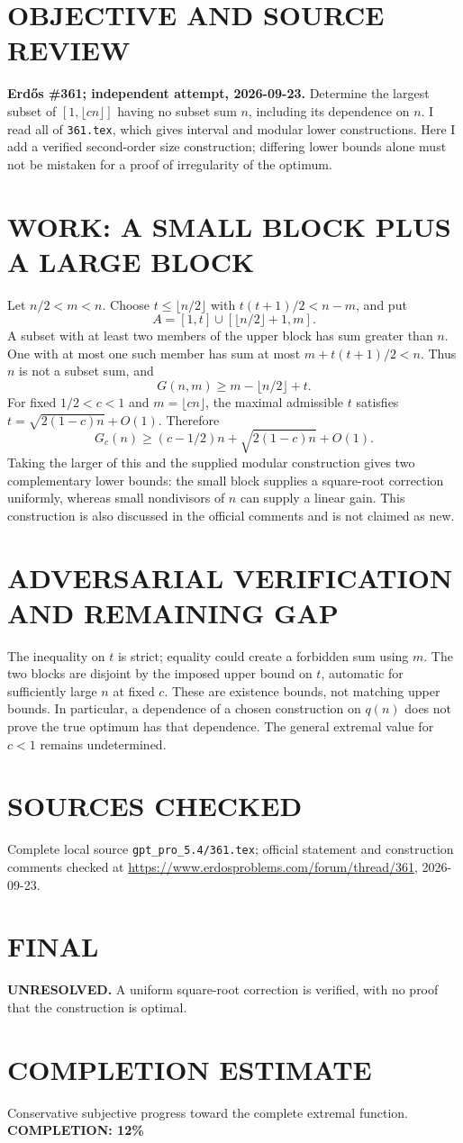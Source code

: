 \section{OBJECTIVE AND SOURCE REVIEW}
\textbf{Erd\H{o}s \#361; independent attempt, 2026-09-23.}
Determine the largest subset of $[1,\lfloor cn\rfloor]$ having no subset sum $n$, including its dependence on $n$. I read all of \texttt{361.tex}, which gives interval and modular lower constructions. Here I add a verified second-order size construction; differing lower bounds alone must not be mistaken for a proof of irregularity of the optimum.
\section{WORK: A SMALL BLOCK PLUS A LARGE BLOCK}
Let $n/2<m<n$. Choose $t\le\lfloor n/2\rfloor$ with $t(t+1)/2<n-m$, and put
\[
A=[1,t]\cup[\lfloor n/2\rfloor+1,m].
\]
A subset with at least two members of the upper block has sum greater than $n$. One with at most one such member has sum at most $m+t(t+1)/2<n$. Thus $n$ is not a subset sum, and
\[
G(n,m)\ge m-\lfloor n/2\rfloor+t.
\]
For fixed $1/2<c<1$ and $m=\lfloor cn\rfloor$, the maximal admissible $t$ satisfies $t=\sqrt{2(1-c)n}+O(1)$. Therefore
\[
G_c(n)\ge(c-1/2)n+\sqrt{2(1-c)n}+O(1).
\]
Taking the larger of this and the supplied modular construction gives two complementary lower bounds: the small block supplies a square-root correction uniformly, whereas small nondivisors of $n$ can supply a linear gain. This construction is also discussed in the official comments and is not claimed as new.
\section{ADVERSARIAL VERIFICATION AND REMAINING GAP}
The inequality on $t$ is strict; equality could create a forbidden sum using $m$. The two blocks are disjoint by the imposed upper bound on $t$, automatic for sufficiently large $n$ at fixed $c$. These are existence bounds, not matching upper bounds. In particular, a dependence of a chosen construction on $q(n)$ does not prove the true optimum has that dependence. The general extremal value for $c<1$ remains undetermined.
\section{SOURCES CHECKED}
Complete local source \texttt{gpt\_pro\_5.4/361.tex}; official statement and construction comments checked at \url{https://www.erdosproblems.com/forum/thread/361}, 2026-09-23.
\section{FINAL}
\textbf{UNRESOLVED.} A uniform square-root correction is verified, with no proof that the construction is optimal.
\section{COMPLETION ESTIMATE}
Conservative subjective progress toward the complete extremal function.
\textbf{COMPLETION: 12\%}
